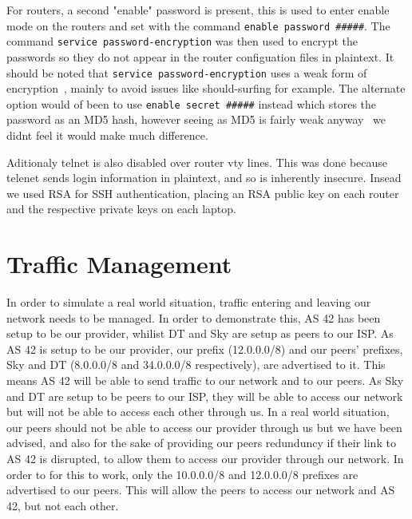 For routers, a second "enable" password is present, this is used to enter
enable mode on the routers and set with the command \texttt{enable password
\#\#\#\#\#}. The command \texttt{service password-encryption} was then used to
encrypt the passwords so they do not appear in the router configuation files in
plaintext. It should be noted that \texttt{service password-encryption} uses a
weak form of encryption~\cite{ciscocracker}, mainly to avoid issues like
should-surfing for example. The alternate option would of been to use
\texttt{enable secret \#\#\#\#\#} instead which stores the password as an MD5
hash, however seeing as MD5 is fairly weak anyway~\cite{md5} we didnt feel it
would make much difference.

Aditionaly telnet is also disabled over router vty lines. This was done because
telenet sends login information in plaintext, and so is inherently insecure.
Insead we used RSA for SSH authentication, placing an RSA public key on each
router and the respective private keys on each laptop.


\section{Traffic Management}
In order to simulate a real world situation, traffic entering and leaving our
network needs to be managed. In order to demonstrate this, AS 42 has been setup
to be our provider, whilist DT and Sky are setup as peers to our ISP. As AS 42
is setup to be our provider, our prefix (12.0.0.0/8) and our peers' prefixes,
Sky and DT (8.0.0.0/8 and 34.0.0.0/8 respectively), are advertised to it. This
means AS 42 will be able to send traffic to our network and to our peers. As
Sky and DT are setup to be peers to our ISP, they will be able to access our
network but will not be able to access each other through us. In a real world
situation, our peers should not be able to access our provider through us but
we have been advised, and also for the sake of providing our peers redunduncy
if their link to AS 42 is disrupted, to allow them to access our provider
through our network. In order to for this to work, only the 10.0.0.0/8 and
12.0.0.0/8 prefixes are advertised to our peers. This will allow the peers to
access our network and AS 42, but not each other.
